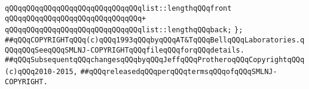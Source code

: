 \verb|qQQqqQQqqQQqqQQqqQQqqQQqqQQqqQQqlist::lengthqQQqfront|\newline
\verb|qQQqqQQqqQQqqQQqqQQqqQQqqQQqqQQq+|\newline
\verb|qQQqqQQqqQQqqQQqqQQqqQQqqQQqqQQqlist::lengthqQQqback;|\newline
\verb|};|\newline
\newline
\newline
\newline
\verb|##qQQqCOPYRIGHTqQQq(c)qQQq1993qQQqbyqQQqAT&TqQQqBellqQQqLaboratories.qQQqqQQqSeeqQQqSMLNJ-COPYRIGHTqQQqfileqQQqforqQQqdetails.|\newline
\verb|##qQQqSubsequentqQQqchangesqQQqbyqQQqJeffqQQqProtheroqQQqCopyrightqQQq(c)qQQq2010-2015,|\newline
\verb|##qQQqreleasedqQQqperqQQqtermsqQQqofqQQqSMLNJ-COPYRIGHT.|\newline

